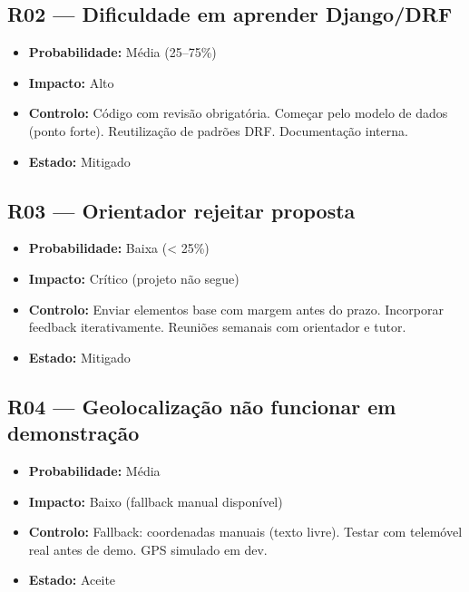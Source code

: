 \documentclass[a4paper,11pt]{article}
\begin{document}
\subsection*{R02 — Dificuldade em aprender Django/DRF}

\begin{itemize}[nosep]
    \item \textbf{Probabilidade:} Média (25--75\%)
    \item \textbf{Impacto:} Alto
    \item \textbf{Controlo:} Código com revisão obrigatória. Começar pelo modelo
          de dados (ponto forte). Reutilização de padrões DRF. Documentação interna.
    \item \textbf{Estado:} Mitigado
\end{itemize}

\subsection*{R03 — Orientador rejeitar proposta}

\begin{itemize}[nosep]
    \item \textbf{Probabilidade:} Baixa (< 25\%)
    \item \textbf{Impacto:} Crítico (projeto não segue)
    \item \textbf{Controlo:} Enviar elementos base com margem antes do prazo.
          Incorporar feedback iterativamente. Reuniões semanais com orientador e tutor.
    \item \textbf{Estado:} Mitigado
\end{itemize}

\subsection*{R04 — Geolocalização não funcionar em demonstração}

\begin{itemize}[nosep]
    \item \textbf{Probabilidade:} Média
    \item \textbf{Impacto:} Baixo (fallback manual disponível)
    \item \textbf{Controlo:} Fallback: coordenadas manuais (texto livre).
          Testar com telemóvel real antes de demo. GPS simulado em dev.
    \item \textbf{Estado:} Aceite
\end{itemize}
\end{document}
